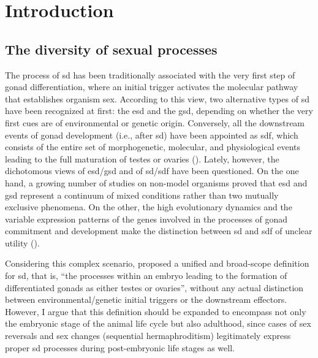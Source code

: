 
% 

{
\chapter{Introduction}

\label{introduction}
}

\section{The diversity of sexual processes}
The process of \gls{sd} has been traditionally associated with the very first step of gonad differentiation, where an initial trigger activates the molecular pathway that establishes organism sex. According to this view, two alternative types of \gls{sd} have been recognized at first: the \gls{esd} and the \gls{gsd}, depending on whether the very first cues are of environmental or genetic origin. Conversely, all the downstream events of gonad development (i.e., after \gls{sd}) have been appointed as \gls{sdf}, which consists of the entire set of morphogenetic, molecular, and physiological events leading to the full maturation of testes or ovaries (\textbf{\cite{uller2011origin, beukeboom2014evolution}}). Lately, however, the dichotomous views of \gls{esd}/\gls{gsd} and of \gls{sd}/\gls{sdf} have been questioned. On the one hand, a growing number of studies on non-model organisms proved that \gls{esd} and \gls{gsd} represent a continuum of mixed conditions rather than two mutually exclusive phenomena. On the other, the high evolutionary dynamics and the variable expression patterns of the genes involved in the processes of gonad commitment and development make the distinction between \gls{sd} and \gls{sdf} of unclear utility (\textbf{\cite{beukeboom2014evolution}}).

Considering this complex scenario, \textbf{\cite{uller2011origin}} proposed a unified and broad-scope definition for \gls{sd}, that is, “the processes within an embryo leading to the formation of differentiated gonads as either testes or ovaries”, without any actual distinction between environmental/genetic initial triggers or the downstream effectors. However, I argue that this definition should be expanded to encompass not only the embryonic stage of the animal life cycle but also adulthood, since cases of sex reversals and sex changes (sequential hermaphroditism) legitimately express proper \gls{sd} processes during post-embryonic life stages as well.

